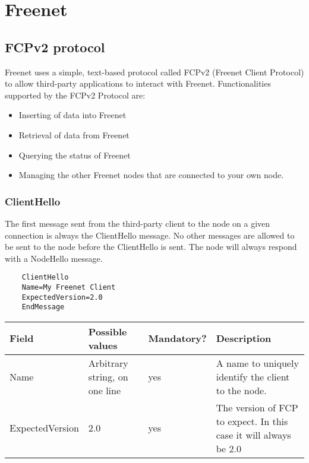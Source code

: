 \chapter{Freenet}
\section{FCPv2 protocol}
Freenet uses a simple, text-based protocol called FCPv2 (Freenet Client Protocol) to allow third-party applications to interact with Freenet. \newline
Functionalities supported by the FCPv2 Protocol are:\cite{FCP}
\begin{itemize}
    \item Inserting of data into Freenet
    \item Retrieval of data from Freenet
    \item Querying the status of Freenet
    \item Managing the other Freenet nodes that are connected to your own node.
\end{itemize}
\newpage
\subsection{ClientHello}
The first message sent from the third-party client to the node on a given connection is always the ClientHello message. No other messages are allowed to be sent to the node before the ClientHello is sent. The node will always respond with a NodeHello message.
\begin{verbatim}
    ClientHello
    Name=My Freenet Client
    ExpectedVersion=2.0
    EndMessage
\end{verbatim}
\begin{tabularx}{\textwidth}{p{3cm}|p{2cm}|p{2.5cm}|p{5.5cm}}
\toprule
    Field & Possible values & Mandatory? & Description \\
\midrule 
Name & Arbitrary string, on one line & yes & A name to uniquely identify the client to the node. \\
\addlinespace
\hline
\addlinespace
ExpectedVersion & 2.0 & yes & The version of FCP to expect. In this case it will always be 2.0 \\
\bottomrule
\end{tabularx}
\newpage
